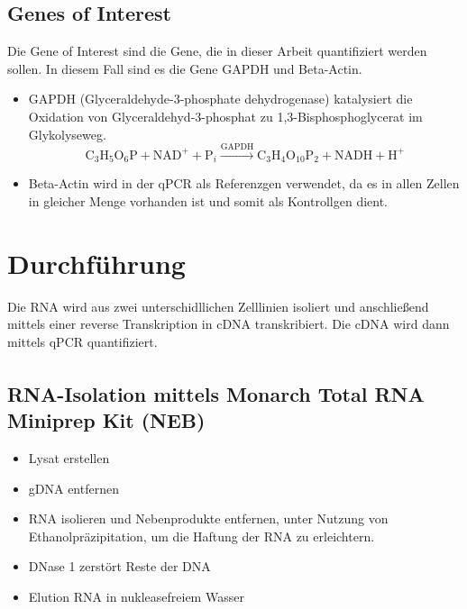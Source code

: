 \documentclass{article}
\begin{document}
\subsection*{Genes of Interest}
Die Gene of Interest sind die Gene, die in dieser Arbeit quantifiziert
werden sollen. In diesem Fall sind es die Gene GAPDH und Beta-Actin.
\begin{itemize}
    \item GAPDH (Glyceraldehyde-3-phosphate dehydrogenase) katalysiert die 
    Oxidation von Glyceraldehyd-3-phosphat zu
    1,3-Bisphosphoglycerat im Glykolyseweg.
\[
\text{C}_3\text{H}_5\text{O}_6\text{P} + \text{NAD}^+ + \text{P}_i \xrightarrow{\text{GAPDH}} \text{C}_3\text{H}_4\text{O}_{10}\text{P}_2 + \text{NADH} + \text{H}^+
\]

    \item Beta-Actin wird in der qPCR als Referenzgen verwendet, da es in allen
    Zellen in gleicher Menge vorhanden ist und somit als Kontrollgen dient.
    
\end{itemize}


\section{Durchführung}

Die RNA wird aus zwei unterschidllichen Zelllinien isoliert und anschließend mittels einer reverse Transkription in cDNA transkribiert. Die cDNA wird dann mittels qPCR quantifiziert.

\subsection{RNA-Isolation mittels Monarch\textsuperscript{\textregistered} Total RNA Miniprep Kit (NEB)}

\begin{itemize}
    \item Lysat erstellen
    \item gDNA entfernen
    \item RNA isolieren und Nebenprodukte entfernen, unter Nutzung
    von Ethanolpräzipitation, um die Haftung der RNA zu erleichtern.
    \item DNase 1 zerstört Reste der DNA
    \item Elution RNA in nukleasefreiem Wasser
\end{itemize}
\end{document}
